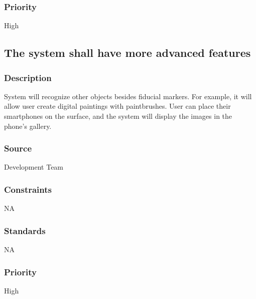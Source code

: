 \subsubsection{Priority}
High

\subsection{The system shall have more advanced features }
\subsubsection{Description}
System will recognize other objects besides fiducial markers. For example, it will allow user create digital paintings with paintbrushes. User can place their smartphones on the surface, and the system will display the images in the phone's gallery.
\subsubsection{Source}
Development Team
\subsubsection{Constraints}
NA
\subsubsection{Standards}
NA
\subsubsection{Priority}
High
